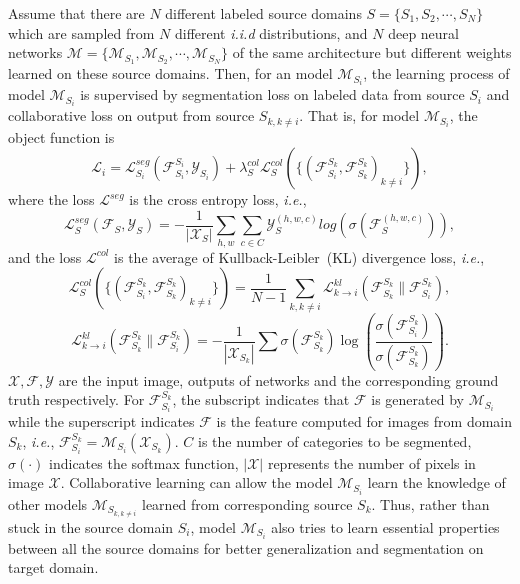 \documentclass[final]{cvpr}
\def\ie{\textit{i.e.}}
\def\X{\mathcal{X}}
\def\Y{\mathcal{Y}}
\def\F{\mathcal{F}}
\def\M{\mathcal{M}}
\begin{document}
Assume that there are $N$ different labeled source domains $S=\{S_1, S_2, \cdots, S_N\}$ which are sampled from $N$ different \textit{i.i.d} distributions, and $N$ deep neural networks $\M=\{\M_{S_1}, \M_{S_2}, \cdots, \M_{S_N}\}$ of the same architecture but different weights learned on these source domains. Then, for an model $\M_{S_i}$, the learning process of model $\M_{S_i}$ is supervised by segmentation loss on labeled data from source $S_i$ and collaborative loss on output from source $S_{k, k\ne i}$. That is, for model $\mathcal{\M}_{S_i}$, the object function is 
\begin{equation}
\mathcal{L}_{i} = \mathcal{L}^{seg}_{S_i}(\F_{S_i}^{S_i}, \Y_{S_i}) + \lambda_S^{col}\mathcal{L}_S^{col}(\{(\F_{S_i}^{S_k}, \F_{S_k}^{S_k})_{k\ne i}\}),
\end{equation}
where the loss $\mathcal{L}^{seg}$ is the cross entropy loss, \ie,
\begin{equation}
\label{equ:ce}
	\mathcal{L}^{seg}_{S}(\F_S, \Y_S) = -\frac{1}{|\X_S|}\sum_{h,w}\sum_{c\in C} \Y^{(h,w,c)}_{S}log(\sigma(\F^{(h,w,c)}_{S})),
\end{equation}
and the loss $\mathcal{L}^{col}$ is the average of Kullback-Leibler~(KL) divergence loss, \ie,
\begin{equation}
\label{equ:col}
	\mathcal{L}_S^{col}(\{(\F_{S_i}^{S_k}, \F_{S_k}^{S_k})_{k\ne i}\}) = \frac{1}{N-1}\sum_{k,k\neq i}\mathcal{L}^{kl}_{k\rightarrow i}(\F_{S_k}^{S_k}\|\F_{S_i}^{S_k}),
\end{equation}
\begin{equation}
\label{equ:kl}
	\mathcal{L}^{kl}_{k\rightarrow i}(\F_{S_k}^{S_k}\|\F_{S_i}^{S_k}) = -\frac{1}{|\X_{S_k}|}\sum\sigma(\F_{S_k}^{S_k})\log(\frac{\sigma(\F_{S_i}^{S_k})}{\sigma(\F_{S_k}^{S_k})}).
\end{equation}
$\X, \F, \Y$ are the input image, outputs of networks and the corresponding ground truth respectively. For $\F_{S_i}^{S_k}$, the subscript indicates that $\F$ is generated by $\M_{S_i}$ while the superscript indicates $\F$ is the feature computed for images from domain $S_k$, \ie, $\F_{S_i}^{S_k} = \M_{S_i}(\X_{S_k})$. $C$ is the number of categories to be segmented, $\sigma(\cdot)$ indicates the softmax function, $|\X|$ represents the number of pixels in image $\X$. Collaborative learning can allow the model $\M_{S_i}$ learn the knowledge of other models $\M_{S_{k, k\neq i}}$ learned from corresponding source $S_k$. Thus, rather than stuck in the source domain $S_i$, model $\M_{S_i}$ also tries to learn essential properties between all the source domains for better generalization and segmentation on target domain.
\end{document}
